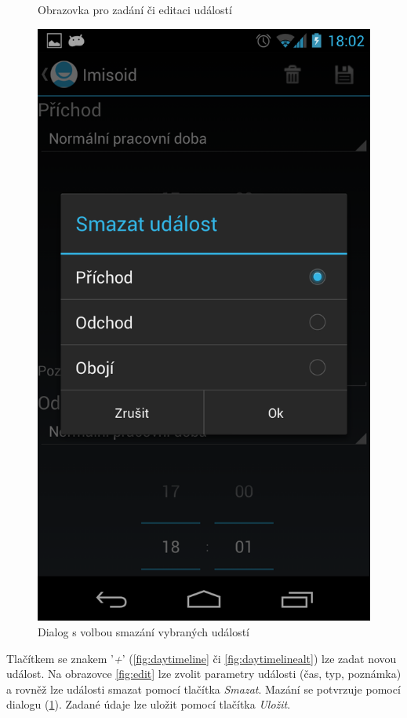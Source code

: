 \documentclass{diplomka}
\begin{document}
\begin{figure}[H]
\begin{minipage}{.45\textwidth}
 \caption{Obrazovka pro zadání či editaci událostí}
  \label{fig:edit}
\end{minipage}\hfill%
\begin{minipage}{.45\textwidth}
   \centering
 \includegraphics[width=.9\linewidth]{scr/delete.png}
 \caption{Dialog s volbou smazání vybraných událostí}
  \label{fig:delete}
\end{minipage}
\end{figure}
Tlačítkem se znakem '\emph{+}' (\ref{fig:daytimeline} či \ref{fig:daytimelinealt}) lze zadat novou událost. Na obrazovce \ref{fig:edit} lze zvolit parametry události (čas, typ, poznámka) a rovněž lze události smazat pomocí tlačítka \emph{Smazat}. Mazání se potvrzuje pomocí dialogu (\ref{fig:delete}). Zadané údaje lze uložit pomocí tlačítka \emph{Uložit}. 
\end{document}
